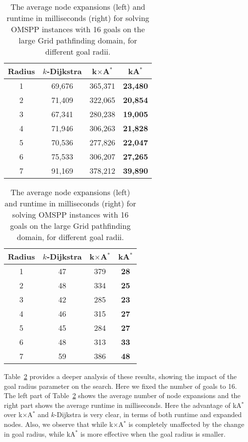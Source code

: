 \documentclass[smallextended]{svjour3}       %
\newcommand{\kD}{$k$-Dijkstra\xspace}
\newcommand{\omspp}{\ac{OMSPP}\xspace}
\newcommand{\kastar}{kA$^*$\xspace}
\newcommand{\kxastar}{k$\times$A$^*$\xspace}
\begin{document}
\begin{table}
  \centering
    \begin{tabular}{cccc}
      \toprule
      Radius  & \kD & \kxastar & \kastar \\
      \midrule
    1      & 69,676             & 365,371                 & \textbf{23,480} \\
    2      & 71,409             & 322,065                 & \textbf{20,854} \\
    3      & 67,341             & 280,238                 & \textbf{19,005} \\
    4      & 71,946             & 306,263                 & \textbf{21,828} \\
    5      & 70,536             & 277,826                 & \textbf{22,047} \\
    6      & 75,533             & 306,207                 & \textbf{27,265} \\
    7      & 91,169             & 378,212                 & \textbf{39,890} \\
      \bottomrule
    \end{tabular}
    \qquad
    \begin{tabular}{cccc}
	  \toprule
	  Radius  & \kD & \kxastar & \kastar \\
	  \midrule
        1      & 47                 & 379                     & \textbf{28} \\
        2      & 48                 & 334                     & \textbf{25} \\
        3      & 42                 & 285                     & \textbf{23} \\
        4      & 46                 & 315                     & \textbf{27} \\
        5      & 45                 & 284                     & \textbf{27} \\
        6      & 48                 & 313                     & \textbf{33} \\
        7      & 59                 & 386                     & \textbf{48} \\
	  \bottomrule
	\end{tabular}
  \caption{The average node expansions (left) and runtime in milliseconds (right) for solving \omspp instances with 16 goals on the large Grid pathfinding domain, for different goal radii.}
  \label{tab:pathfinding-radius}
\end{table}



Table~\ref{tab:pathfinding-radius} provides a deeper analysis of these results, showing the impact of the goal radius parameter on the search. Here we fixed the number of goals to 16. The left part of Table~\ref{tab:pathfinding-radius} shows the average number of node expansions and the right part shows the average runtime in milliseconds. Here the advantage of \kastar over \kxastar and \kD is very clear, in terms of both runtime and expanded nodes. Also, 
we observe that while \kxastar is completely unaffected by the change in goal radius, 
while \kastar is more effective when the goal radius is smaller. 
\end{document}
